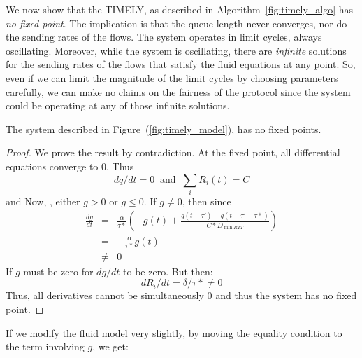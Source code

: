 We now show that the TIMELY, as described
in Algorithm~\ref{fig:timely_algo} has \emph{no fixed point}. The implication
is that the queue length never converges, nor do the sending rates of the flows.
The system operates in limit cycles, always oscillating. Moreover, while the
system is oscillating, there are \emph{infinite} solutions for the sending rates
of the flows that satisfy the fluid equations at any point. So, even if we can
limit the magnitude of the limit cycles by choosing parameters carefully, we can
make no claims on the fairness of the protocol since the system could be
operating at any of those infinite solutions.

\begin{thm} 
\label{thm:nofixed}
The system described in Figure~(\ref{fig:timely_model}), has no fixed points.
\end{thm}
\begin{proof}
We prove the result by contradiction. At the fixed point, all
differential equations converge to 0. Thus
\begin{equation*}
{dq}/{dt} = 0 \; \; \mbox{and} \; \;  \sum_{i} R_i(t) =  C
\end{equation*}  and 
Now, , either $g > 0$ or $g  \le 0$. If $g \ne 0$, then since 
\begin{eqnarray*}
\frac{{dg}}{{dt}} & = & \frac{\alpha }{{\tau *}}( - g(t) + \frac{{q(t
                        - \tau ') - q(t - \tau ' - \tau
                        *)}}{{C*{D_{\min RTT}}}})\\
& = &  -\frac{\alpha }{{\tau *}} g(t)  \\
& \ne & 0 
\end{eqnarray*}
If $g$ must be zero for $dg/dt$ to be zero. But then:
\begin{equation*}
{dR_i}/{dt} =  {\delta }/{{\tau *}} \ne 0
\end{equation*}
Thus, all derivatives cannot be simultaneously 0 and thus the system has no fixed
point.
\end{proof}

If we modify the fluid model very slightly, by moving the equality condition to
the term involving $g$, we get:

